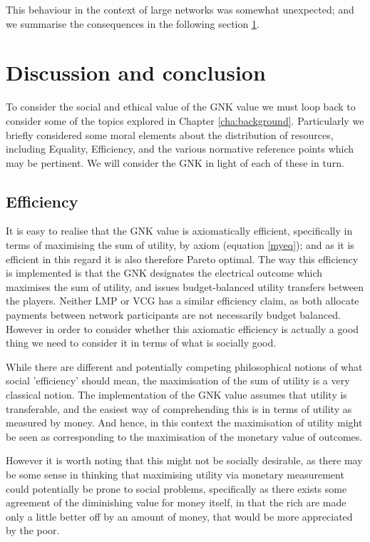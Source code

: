 This behaviour in the context of large networks was somewhat unexpected; and we summarise the consequences in the following section \ref{sec:GNK_value_discussion}.


\section{Discussion and conclusion}\label{sec:GNK_value_discussion}

To consider the social and ethical value of the GNK value we must loop back to consider some of the topics explored in Chapter \ref{cha:background}.
Particularly we briefly considered some moral elements about the distribution of resources, including Equality, Efficiency, and the various normative reference points which may be pertinent.
We will consider the GNK in light of each of these in turn.

\subsection{Efficiency}
It is easy to realise that the GNK value is axiomatically efficient, specifically in terms of maximising the sum of utility, by axiom (equation \ref{myeq}); and as it is efficient in this regard it is also therefore Pareto optimal.
The way this efficiency is implemented is that the GNK designates the electrical outcome which maximises the sum of utility, and issues budget-balanced utility transfers between the players.
Neither LMP or VCG has a similar efficiency claim, as both allocate payments between network participants are not necessarily budget balanced.
However in order to consider whether this axiomatic efficiency is actually a good thing we need to consider it in terms of what is socially good.

While there are different and potentially competing philosophical notions of what social 'efficiency' should mean, the maximisation of the sum of utility is a very classical notion.
The implementation of the GNK value assumes that utility is transferable, and the easiest way of comprehending this is in terms of utility as measured by money. And hence, in this context the maximisation of utility might be seen as corresponding to the maximisation of the monetary value of outcomes.

However it is worth noting that this might not be socially desirable, as there may be some sense in thinking that maximising utility via monetary measurement could potentially be prone to social problems, specifically as there exists some agreement of the diminishing value for money itself, in that the rich are made only a little better off by an amount of money, that would be more appreciated by the poor.

